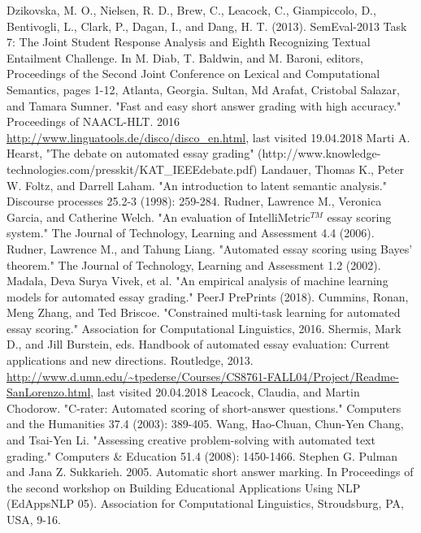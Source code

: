 \documentclass[rnd]{mas_report}
\begin{document}
\begin{thebibliography}{3}
 Dzikovska, M. O., Nielsen, R. D., Brew, C., Leacock, C., Giampiccolo, D., Bentivogli, L., Clark, P., Dagan, I., and Dang, H. T. (2013). SemEval-2013 Task 7: The Joint Student Response Analysis and Eighth Recognizing Textual Entailment Challenge. In M. Diab, T. Baldwin, and M. Baroni, editors, Proceedings of the Second Joint Conference on Lexical and Computational Semantics, pages 1-12, Atlanta, Georgia.
 Sultan, Md Arafat, Cristobal Salazar, and Tamara Sumner. "Fast and easy short answer grading with high accuracy." Proceedings of NAACL-HLT. 2016
 \url{http://www.linguatools.de/disco/disco_en.html}, last visited 19.04.2018
 Marti A. Hearst, "The debate on automated essay grading" (http://www.knowledge-technologies.com/presskit/KAT\_IEEEdebate.pdf) 
 Landauer, Thomas K., Peter W. Foltz, and Darrell Laham. "An introduction to latent semantic analysis." Discourse processes 25.2-3 (1998): 259-284.
 Rudner, Lawrence M., Veronica Garcia, and Catherine Welch. "An evaluation of IntelliMetric$^{TM}$ essay scoring system." The Journal of Technology, Learning and Assessment 4.4 (2006).
 Rudner, Lawrence M., and Tahung Liang. "Automated essay scoring using Bayes' theorem." The Journal of Technology, Learning and Assessment 1.2 (2002).
 Madala, Deva Surya Vivek, et al. "An empirical analysis of machine learning models for automated essay grading." PeerJ PrePrints (2018).
 Cummins, Ronan, Meng Zhang, and Ted Briscoe. "Constrained multi-task learning for automated essay scoring." Association for Computational Linguistics, 2016.
 Shermis, Mark D., and Jill Burstein, eds. Handbook of automated essay evaluation: Current applications and new directions. Routledge, 2013.
\url{http://www.d.umn.edu/~tpederse/Courses/CS8761-FALL04/Project/Readme-SanLorenzo.html}, last visited 20.04.2018
  Leacock, Claudia, and Martin Chodorow. "C-rater: Automated scoring of short-answer questions." Computers and the Humanities 37.4 (2003): 389-405.
 Wang, Hao-Chuan, Chun-Yen Chang, and Tsai-Yen Li. "Assessing creative problem-solving with automated text grading." Computers \& Education 51.4 (2008): 1450-1466.
 Stephen G. Pulman and Jana Z. Sukkarieh. 2005. Automatic short answer marking. In Proceedings of the second workshop on Building Educational Applications Using NLP (EdAppsNLP 05). Association for Computational Linguistics, Stroudsburg, PA, USA, 9-16.

\end{thebibliography}
\end{document}
